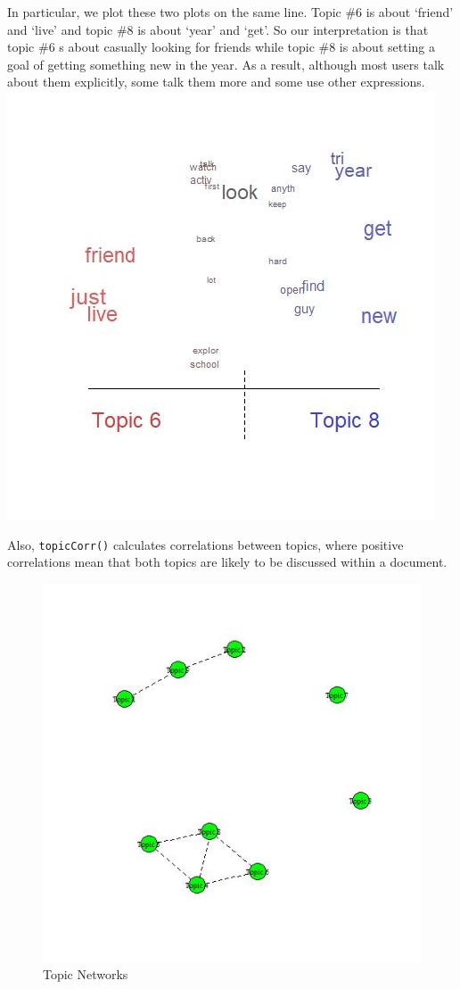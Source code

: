 \documentclass[]{article}
\begin{document}
In particular, we plot these two plots on the same line. Topic \#6 is
about `friend' and `live' and topic \#8 is about `year' and `get'. So
our interpretation is that topic \#6 s about casually looking for
friends while topic \#8 is about setting a goal of getting something new
in the year. As a result, although most users talk about them
explicitly, some talk them more and some use other expressions.
\includegraphics{Plots/comparison.jpeg}

Also, \texttt{topicCorr()} calculates correlations between topics, where
positive correlations mean that both topics are likely to be discussed
within a document.

\begin{figure}
\centering
\includegraphics{Plots/network.jpeg}
\caption{Topic Networks}
\end{figure}
\end{document}
